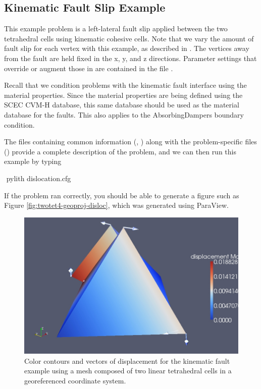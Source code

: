 \subsection{Kinematic Fault Slip Example}

This example problem is a left-lateral fault slip applied between
the two tetrahedral cells using kinematic cohesive cells. Note that
we vary the amount of fault slip for each vertex with this example,
as described in 
. The vertices away from the fault
are held fixed in the x, y, and z directions. Parameter settings that
override or augment those in  are contained
in the file .

Recall that we condition problems with the kinematic fault interface
using the material properties. Since the material properties are being
defined using the SCEC CVM-H database, this same database should be
used as the material database for the faults. This also applies to
the AbsorbingDampers boundary condition.

The files containing common information (, )
along with the problem-specific files () provide a complete description of
the problem, and we can then run this example by typing
\begin{shell}
$$ pylith dislocation.cfg
\end{shell}
If the problem ran correctly, you should be able to generate a figure
such as Figure \vref{fig:twotet4-geoproj-disloc}, which was generated
using ParaView.

\begin{figure}
  \includegraphics[scale=0.33]{examples/figs/twotet4-geoproj-dislocation}
  \caption{Color contours and vectors of displacement for the kinematic fault
    example using a mesh composed of two linear tetrahedral cells in a
    georeferenced coordinate system.}
  \label{fig:twotet4-geoproj-disloc}
\end{figure}



